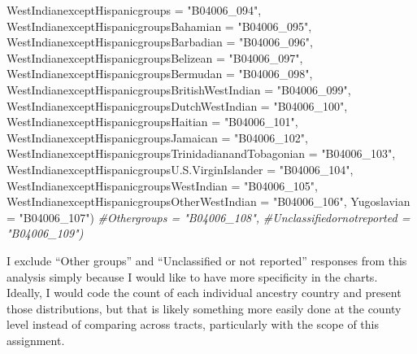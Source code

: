 \documentclass[
]{article}
\newenvironment{Shaded}{\begin{snugshade}}{\end{snugshade}}
\newcommand{\CommentTok}[1]{\textcolor[rgb]{0.56,0.35,0.01}{\textit{#1}}}
\newcommand{\DataTypeTok}[1]{\textcolor[rgb]{0.13,0.29,0.53}{#1}}
\newcommand{\NormalTok}[1]{#1}
\newcommand{\StringTok}[1]{\textcolor[rgb]{0.31,0.60,0.02}{#1}}
\begin{document}
\begin{Shaded}
\begin{Highlighting}[]
                   \DataTypeTok{WestIndianexceptHispanicgroups =} \StringTok{"B04006_094"}\NormalTok{,}
                   \DataTypeTok{WestIndianexceptHispanicgroupsBahamian =} \StringTok{"B04006_095"}\NormalTok{,}
                   \DataTypeTok{WestIndianexceptHispanicgroupsBarbadian =} \StringTok{"B04006_096"}\NormalTok{,}
                   \DataTypeTok{WestIndianexceptHispanicgroupsBelizean =} \StringTok{"B04006_097"}\NormalTok{,}
                   \DataTypeTok{WestIndianexceptHispanicgroupsBermudan =} \StringTok{"B04006_098"}\NormalTok{,}
                   \DataTypeTok{WestIndianexceptHispanicgroupsBritishWestIndian =} \StringTok{"B04006_099"}\NormalTok{,}
                   \DataTypeTok{WestIndianexceptHispanicgroupsDutchWestIndian =} \StringTok{"B04006_100"}\NormalTok{,}
                   \DataTypeTok{WestIndianexceptHispanicgroupsHaitian =} \StringTok{"B04006_101"}\NormalTok{,}
                   \DataTypeTok{WestIndianexceptHispanicgroupsJamaican =} \StringTok{"B04006_102"}\NormalTok{,}
                   \DataTypeTok{WestIndianexceptHispanicgroupsTrinidadianandTobagonian =} \StringTok{"B04006_103"}\NormalTok{,}
                   \DataTypeTok{WestIndianexceptHispanicgroupsU.S.VirginIslander =} \StringTok{"B04006_104"}\NormalTok{,}
                   \DataTypeTok{WestIndianexceptHispanicgroupsWestIndian =} \StringTok{"B04006_105"}\NormalTok{,}
                   \DataTypeTok{WestIndianexceptHispanicgroupsOtherWestIndian =} \StringTok{"B04006_106"}\NormalTok{,}
                   \DataTypeTok{Yugoslavian =} \StringTok{"B04006_107"}\NormalTok{)}
                   \CommentTok{#Othergroups = "B04006_108",}
                   \CommentTok{#Unclassifiedornotreported = "B04006_109")}
\end{Highlighting}
\end{Shaded}

I exclude ``Other groups'' and ``Unclassified or not reported''
responses from this analysis simply because I would like to have more
specificity in the charts. Ideally, I would code the count of each
individual ancestry country and present those distributions, but that is
likely something more easily done at the county level instead of
comparing across tracts, particularly with the scope of this assignment.
\end{document}
